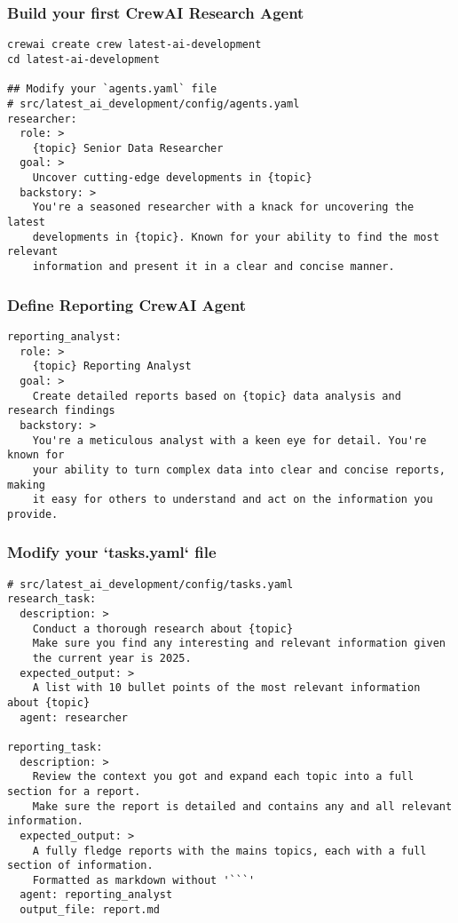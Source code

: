 \begin{frame}[fragile]\frametitle{Build your first CrewAI Research Agent}

    \begin{lstlisting}
crewai create crew latest-ai-development
cd latest-ai-development

## Modify your `agents.yaml` file
# src/latest_ai_development/config/agents.yaml
researcher:
  role: >
    {topic} Senior Data Researcher
  goal: >
    Uncover cutting-edge developments in {topic}
  backstory: >
    You're a seasoned researcher with a knack for uncovering the latest
    developments in {topic}. Known for your ability to find the most relevant
    information and present it in a clear and concise manner.
    \end{lstlisting}	
\end{frame}


\begin{frame}[fragile]\frametitle{Define Reporting CrewAI Agent}


    \begin{lstlisting}
reporting_analyst:
  role: >
    {topic} Reporting Analyst
  goal: >
    Create detailed reports based on {topic} data analysis and research findings
  backstory: >
    You're a meticulous analyst with a keen eye for detail. You're known for
    your ability to turn complex data into clear and concise reports, making
    it easy for others to understand and act on the information you provide.
    \end{lstlisting}	
\end{frame}

\begin{frame}[fragile]\frametitle{Modify your `tasks.yaml` file}


    \begin{lstlisting}
# src/latest_ai_development/config/tasks.yaml
research_task:
  description: >
    Conduct a thorough research about {topic}
    Make sure you find any interesting and relevant information given
    the current year is 2025.
  expected_output: >
    A list with 10 bullet points of the most relevant information about {topic}
  agent: researcher

reporting_task:
  description: >
    Review the context you got and expand each topic into a full section for a report.
    Make sure the report is detailed and contains any and all relevant information.
  expected_output: >
    A fully fledge reports with the mains topics, each with a full section of information.
    Formatted as markdown without '```'
  agent: reporting_analyst
  output_file: report.md
    \end{lstlisting}	
\end{frame}

